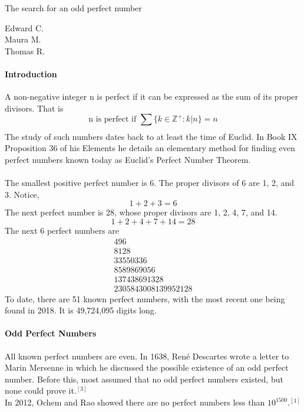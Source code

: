 \documentclass[12pt]{article}
\begin{document}
\begin{center}
\Large
The search for an odd perfect number
\end{center}

\begin{flushright}
Edward C.\\
\vspace{2 mm}
Maura M.\\
\vspace{2 mm}
Thomas R.\\
\end{flushright}

\paragraph*{Introduction}
A non-negative integer n is perfect if it can be expressed as the sum of its proper divisors.  
That is $$\text{n is perfect if }\sum_{}{}\{k \in \mathbb{Z}^+ : k|n\} = n$$
The study of such numbers dates back to at least the time of Euclid. In Book IX Proposition 36 of his Elements he details an elementary method for finding even perfect numbers known today as Euclid’s Perfect Number Theorem. \\
\\
The smallest positive perfect number is 6. The proper divisors of 6 are 1, 2, and 3. Notice, $$1+2+3=6$$
The next perfect number is 28, whose proper divisors are 1, 2, 4, 7, and 14.
$$1+2+4+7+14=28$$
The next 6 perfect numbers are
 $$\begin{array}{r}
496\\
8128\\
33550336\\
8589869056\\
137438691328\\
2305843008139952128
\end{array}$$
To date, there are 51 known perfect numbers, with the most recent one being found in 2018. It is 49,724,095 digits long.
\paragraph*{Odd Perfect Numbers}
All known perfect numbers are even. In 1638, René Descartes wrote a letter to Marin Mersenne in which he discussed the possible existence of an odd perfect number. Before this, most assumed that no odd perfect numbers existed, but none could prove it.$^{[3]}$ \\
In 2012, Ochem and Rao showed there are no perfect numbers less than $10^{1500}$.$^{[1]}$
\end{document}
